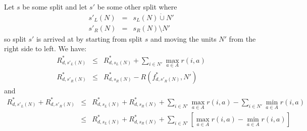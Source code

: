 \documentclass{article}
\begin{document}
Let $s$ be some split and let $s'$ be some other split where
\begin{eqnarray}
  \label{eq:splits}
  s'_{L}(N) & = & s_{L}(N) \dot\cup N' \\
  s'_{R}(N) & = & s_{R}(N) \setminus N' 
\end{eqnarray}
so split $s'$ is arrived at by starting from split $s$ and moving the
units $N'$ from the right side to left.
We have:
\begin{eqnarray}
  \label{eq:splitsub}
  R^{*}_{d,s'_{L}(N)} & \leq & R^{*}_{d,s_{L}(N)} +  \sum_{i \in N'}
                               \max_{a \in A} r(i,a) \\
  R^{*}_{d,s'_{R}(N)} & \leq & R^{*}_{d,s_{R}(N)} -  R(f^{*}_{d,s'_{R}(N)},N')
\end{eqnarray}
and
\begin{eqnarray*}
  \label{eq:sumub}
  R^{*}_{d,s'_{L}(N)} +  R^{*}_{d,s'_{R}(N)}
  & \leq
  &  R^{*}_{d,s_{L}(N)}
    +  R^{*}_{d,s_{R}(N)}
    +  \sum_{i \in N'} \max_{a \in A} r(i,a)
    -  \sum_{i \in N'} \min_{a \in A} r(i,a) \\
  & \leq
  & R^{*}_{d,s_{L}(N)}
    +  R^{*}_{d,s_{R}(N)}
    +  \sum_{i \in N'} \left[ \max_{a \in A} r(i,a)- \min_{a \in A}
    r(i,a) \right]
\end{eqnarray*}


\end{document}
